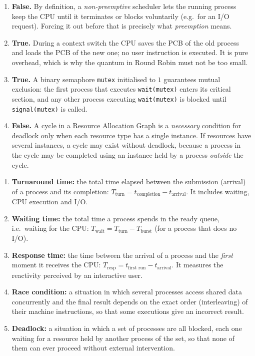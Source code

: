 \documentclass[11pt]{article}
\newcommand{\cle}[1]{{\popxbold\color{popdark}#1}}
\begin{document}
\begin{corrige}
\begin{enumerate}
\item \textbf{False.} By definition, a \emph{non-preemptive} scheduler lets the running process keep the CPU until it terminates or blocks voluntarily (e.g.\ for an I/O request). Forcing it out before that is precisely what \emph{preemption} means.
\item \textbf{True.} During a \cle{context switch} the CPU saves the PCB of the old process and loads the PCB of the new one; no user instruction is executed. It is pure overhead, which is why the quantum in Round Robin must not be too small.
\item \textbf{True.} A binary semaphore \texttt{mutex} initialised to $1$ guarantees mutual exclusion: the first process that executes \texttt{wait(mutex)} enters its critical section, and any other process executing \texttt{wait(mutex)} is blocked until \texttt{signal(mutex)} is called.
\item \textbf{False.} A cycle in a Resource Allocation Graph is a \emph{necessary} condition for deadlock only when each resource type has a single instance. If resources have several instances, a cycle may exist without deadlock, because a process in the cycle may be completed using an instance held by a process \emph{outside} the cycle.
\end{enumerate}
\end{corrige}

\begin{corrige}
\begin{enumerate}
\item \textbf{Turnaround time:} the total time elapsed between the submission (arrival) of a process and its completion: $T_{\text{turn}} = t_{\text{completion}} - t_{\text{arrival}}$. It includes waiting, CPU execution and I/O.
\item \textbf{Waiting time:} the total time a process spends in the ready queue, i.e.\ waiting for the CPU: $T_{\text{wait}} = T_{\text{turn}} - T_{\text{burst}}$ (for a process that does no I/O).
\item \textbf{Response time:} the time between the arrival of a process and the \emph{first} moment it receives the CPU: $T_{\text{resp}} = t_{\text{first run}} - t_{\text{arrival}}$. It measures the reactivity perceived by an interactive user.
\item \textbf{Race condition:} a situation in which several processes access shared data concurrently and the final result depends on the exact order (interleaving) of their machine instructions, so that some executions give an incorrect result.
\item \textbf{Deadlock:} a situation in which a set of processes are all blocked, each one waiting for a resource held by another process of the set, so that none of them can ever proceed without external intervention.
\end{enumerate}
\end{corrige}
\end{document}
